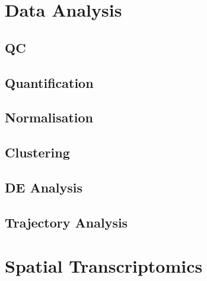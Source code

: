 \documentclass[aspectratio=169,11pt]{beamer}
\begin{document}
\section{Data Analysis}

\subsection{QC}

\subsection{Quantification}

\subsection{Normalisation}

\subsection{Clustering}

\subsection{DE Analysis}

\subsection{Trajectory Analysis}

\section{Spatial Transcriptomics}
\end{document}
